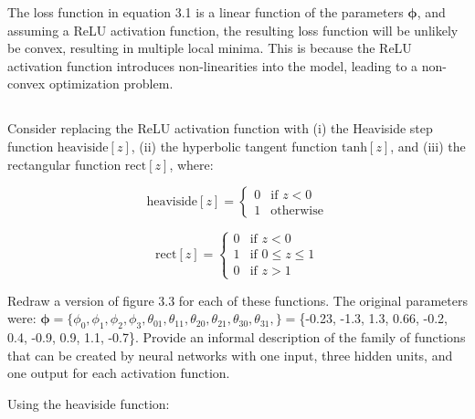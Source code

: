 \documentclass[12pt]{report}
\begin{document}
The loss function in equation 3.1 is a linear function of the parameters $\boldsymbol{\phi}$, and assuming a ReLU activation function, the resulting loss function will be unlikely be convex, resulting in multiple local minima. This is because the ReLU activation function introduces non-linearities into the model, leading to a non-convex optimization problem.

\subsection{}
\begin{mdframed}
    Consider replacing the ReLU activation function with (i) the Heaviside step function $\text{heaviside}[z]$, (ii) the hyperbolic tangent function $\text{tanh}[z]$, and (iii) the rectangular function $\text{rect}[z]$, where:

    \begin{equation*}
        \text{heaviside}[z] = \begin{cases}
            0 & \text{if } z < 0 \\
            1 & \text{otherwise}
        \end{cases}
    \end{equation*}

    \begin{equation*}
        \text{rect}[z] = \begin{cases}
            0 & \text{if } z < 0           \\
            1 & \text{if } 0 \leq z \leq 1 \\
            0 & \text{if } z > 1
        \end{cases}
    \end{equation*}

    Redraw a version of figure 3.3 for each of these functions.
    The original parameters were: $\boldsymbol{\phi} = \{\phi_{0}, \phi_{1}, \phi_{2}, \phi_{3}, \theta_{01}, \theta_{11}, \theta_{20}, \theta_{21}, \theta_{30}, \theta_{31},\}=$\{-0.23, -1.3, 1.3, 0.66, -0.2, 0.4, -0.9, 0.9, 1.1, -0.7\}. Provide an informal description of the family of functions that can be created by neural networks with one input, three hidden units, and one output for each activation function.
\end{mdframed}

Using the heaviside function:
\end{document}
